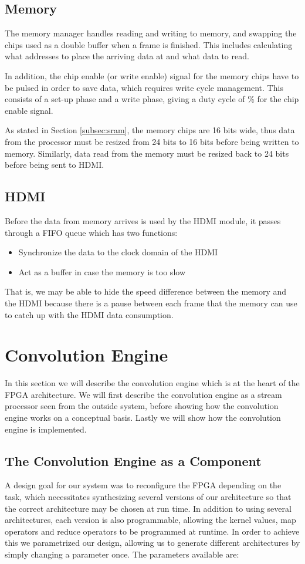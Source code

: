 \subsection{Memory}
The memory manager handles reading and writing to memory, and swapping the chips used as a double buffer when a frame is finished.
This includes calculating what addresses to place the arriving data at and what data to read.

In addition, the chip enable (or write enable) signal for the memory chips have to be pulsed in order to save data, which requires write cycle management.
This consists of a set-up phase and a write phase, giving a duty cycle of \unit[50]{\%} for the chip enable signal.

As stated in Section \ref{subsec:sram}, the memory chips are 16 bits wide, thus data from the processor must be resized from 24 bits to 16 bits before being written to memory.
Similarly, data read from the memory must be resized back to 24 bits before being sent to HDMI.

\subsection{HDMI}
Before the data from memory arrives is used by the HDMI module, it passes through a FIFO queue which has two functions:
\begin{itemize}
    \item Synchronize the data to the clock domain of the HDMI
    \item Act as a buffer in case the memory is too slow
\end{itemize}

That is, we may be able to hide the speed difference between the memory and the HDMI because there is a pause between each frame that the memory can use to catch up with the HDMI data consumption.

\section{Convolution Engine}
\label{sec:processor}
In this section we will describe the convolution engine which is at the heart of the FPGA architecture.
We will first describe the convolution engine as a stream processor seen from the outside system, before showing how the convolution engine works on a conceptual basis.
Lastly we will show how the convolution engine is implemented.

\subsection{The Convolution Engine as a Component}
A design goal for our system was to reconfigure the FPGA depending on the task, which necessitates synthesizing several versions of our architecture so that the correct architecture may be chosen at run time.
In addition to using several architectures, each version is also programmable, allowing the kernel values, map operators and reduce operators to be programmed at runtime.
In order to achieve this we parametrized our design, allowing us to generate different architectures by simply changing a parameter once.
The parameters available are:

